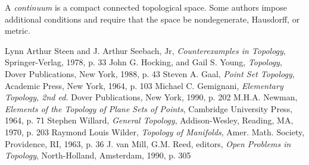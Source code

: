 \documentclass[12pt]{article}
\begin{document}
A {\it continuum} is a compact connected  topological space.
Some authors  impose additional conditions and require that the space be  nondegenerate, Hausdorff, 
or metric.

\begin{thebibliography}{0}
Lynn Arthur Steen and J. Arthur Seebach, Jr,
{\it Counterexamples in Topology}, Springer-Verlag, 1978, p. 33
John G. Hocking, and Gail S. Young, 
{\it Topology}, Dover Publications, New York, 1988, p. 43
Steven A. Gaal, 
{\it Point Set Topology}, Academic Press, New York, 1964, p. 103
Michael C. Gemignani, 
{\it Elementary Topology, 2nd ed.} Dover Publications, New York, 1990, p. 202
M.H.A. Newman, 
{\it Elements of the Topology of Plane Sets of Points}, Cambridge University Press, 1964, p. 71
Stephen Willard, 
{\it General Topology}, Addison-Wesley, Reading, MA, 1970, p. 203
Raymond Louis Wilder, 
{\it Topology of Manifolds}, Amer. Math. Society, Providence, RI, 1963, p. 36
J. van Mill, G.M. Reed, editors,
{\it Open Problems in Topology}, North-Holland, Amsterdam, 1990, p. 305
\end{thebibliography}


\end{document}
